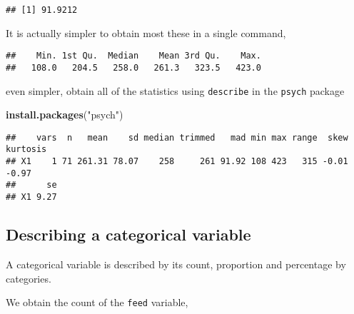 \documentclass[]{book}
\newenvironment{Shaded}{\begin{snugshade}}{\end{snugshade}}
\newcommand{\KeywordTok}[1]{\textcolor[rgb]{0.13,0.29,0.53}{\textbf{#1}}}
\newcommand{\StringTok}[1]{\textcolor[rgb]{0.31,0.60,0.02}{#1}}
\newcommand{\OperatorTok}[1]{\textcolor[rgb]{0.81,0.36,0.00}{\textbf{#1}}}
\newcommand{\NormalTok}[1]{#1}
\theoremstyle{definition}
\theoremstyle{definition}
\theoremstyle{remark}
\begin{document}
\begin{verbatim}
## [1] 91.9212
\end{verbatim}

It is actually simpler to obtain most these in a single command,

\begin{Shaded}
\end{Shaded}

\begin{verbatim}
##    Min. 1st Qu.  Median    Mean 3rd Qu.    Max. 
##   108.0   204.5   258.0   261.3   323.5   423.0
\end{verbatim}

even simpler, obtain all of the statistics using \texttt{describe} in
the \texttt{psych} package

\begin{Shaded}
\begin{Highlighting}[]
\KeywordTok{install.packages}\NormalTok{(}\StringTok{"psych"}\NormalTok{)}
\end{Highlighting}
\end{Shaded}

\begin{Shaded}
\end{Shaded}

\begin{verbatim}
##    vars  n   mean    sd median trimmed   mad min max range  skew kurtosis
## X1    1 71 261.31 78.07    258     261 91.92 108 423   315 -0.01    -0.97
##      se
## X1 9.27
\end{verbatim}

\subsection{Describing a categorical
variable}\label{describing-a-categorical-variable}

A categorical variable is described by its count, proportion and
percentage by categories.

We obtain the count of the \texttt{feed} variable,

\begin{Shaded}
\end{Shaded}
\end{document}
